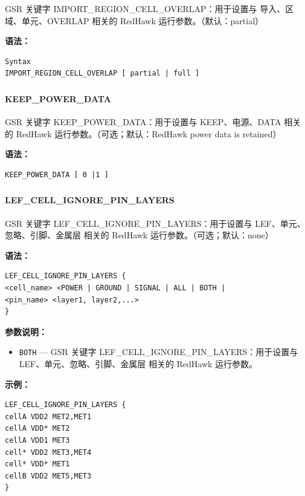 GSR 关键字 IMPORT_REGION_CELL_OVERLAP：用于设置与 导入、区域、单元、OVERLAP 相关的 RedHawk 运行参数。（默认：partial）

\textbf{语法：}
\begin{lstlisting}
Syntax
IMPORT_REGION_CELL_OVERLAP [ partial | full ]
\end{lstlisting}

\subsubsection{}
\paragraph*{KEEP_POWER_DATA}

GSR 关键字 KEEP_POWER_DATA：用于设置与 KEEP、电源、DATA 相关的 RedHawk 运行参数。（可选；默认：RedHawk power data is retained）

\textbf{语法：}
\begin{lstlisting}
KEEP_POWER_DATA [ 0 |1 ]
\end{lstlisting}

\subsubsection{}
\paragraph*{LEF_CELL_IGNORE_PIN_LAYERS}

GSR 关键字 LEF_CELL_IGNORE_PIN_LAYERS：用于设置与 LEF、单元、忽略、引脚、金属层 相关的 RedHawk 运行参数。（可选；默认：none）

\textbf{语法：}
\begin{lstlisting}
LEF_CELL_IGNORE_PIN_LAYERS {
<cell_name> <POWER | GROUND | SIGNAL | ALL | BOTH |
<pin_name> <layer1, layer2,...>
}
\end{lstlisting}

\textbf{参数说明：}
\begin{itemize}
\item \texttt{BOTH} — GSR 关键字 LEF\_CELL\_IGNORE\_PIN\_LAYERS：用于设置与 LEF、单元、忽略、引脚、金属层 相关的 RedHawk 运行参数。
\end{itemize}

\textbf{示例：}
\begin{lstlisting}
LEF_CELL_IGNORE_PIN_LAYERS {
cellA VDD2 MET2,MET1
cellA VDD* MET2
cellA VDD1 MET3
cell* VDD2 MET3,MET4
cell* VDD* MET1
cellB VDD2 MET5,MET3
}
\end{lstlisting}

